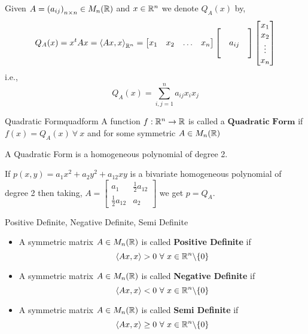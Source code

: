 \documentclass[../Analysis-3.tex]{subfiles}
\begin{document}
\begin{notnBox}
  Given $A = \left( a_{ij} \right)_{n\times n} \in M_n(\mathbb{R})$ and $ x \in \mathbb{R}^n $ we denote $ Q_A(x) $  by,
  \[ Q_A(x) = x^tAx = {\left\langle Ax, x \right\rangle}_{\mathbb{R}^n} = {\begin{bmatrix}
      x_1 & x_2 & \ldots & x_n
    \end{bmatrix} \begin{bmatrix}
       &        & \\
       & a_{ij} & \\
       &        &
    \end{bmatrix} \begin{bmatrix}
      x_1    \\
      x_2    \\
      \vdots \\
      x_n
    \end{bmatrix}} \]
  i.e.,   \[ Q_A(x) = \sum_{i,j = 1}^{n} a_{ij} x_i x_j  \]
\end{notnBox}


\begin{Def}{Quadratic Form}{quadform}
  A function $f : \mathbb{R}^n \to \mathbb{R}$ is called a $\textbf{Quadratic Form}$ if $f(x) = Q_A(x) \ \forall\ x $ and for some symmetric $A \in M_n(\mathbb{R})$
\end{Def}

A Quadratic Form is a homogeneous polynomial of degree 2.

If $p(x,y) = a_1 x^2 + a_2 y^2 + a_{12} xy$
is a bivariate homogeneous polynomial of degree 2 then taking, $A = \begin{bmatrix}
    a_1                & \frac{1}{2} a_{12} \\
    \frac{1}{2} a_{12} & a_2
  \end{bmatrix}$ we get $p = Q_A$.

\begin{Def}{Positive Definite, Negative Definite, Semi Definite}{}
  \begin{itemize}
    \item A symmetric matrix $A \in M_n(\mathbb{R})$ is called \textbf{Positive Definite} if \[ \left\langle Ax, x \right\rangle > 0 \ \forall\ x \in \R^n \backslash \{0\} \]
    \item A symmetric matrix $A \in M_n(\mathbb{R})$ is called \textbf{Negative Definite} if \[ \left\langle Ax, x \right\rangle < 0 \ \forall\ x \in \R^n \backslash \{0\} \]
    \item A symmetric matrix $A \in M_n(\mathbb{R})$ is called \textbf{Semi Definite} if \[ \left\langle Ax, x \right\rangle \geq 0 \ \forall\ x \in \R^n \backslash \{0\} \]
  \end{itemize}
\end{Def}
\end{document}
